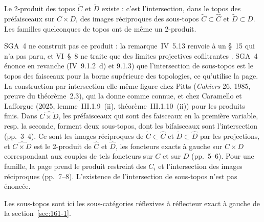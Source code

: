 \begin{encadre}
\begin{theoreme*}\nonverifie
Le 2-produit des topos $\tilde C$ et $\tilde D$ existe : c'est l'intersection, dans le topos des préfaisceaux sur $C \times D$, des images réciproques des sous-topos $\tilde C \subset \hat C$ et $\tilde D \subset \hat D$. Les familles quelconques de topos ont de même un 2-produit.
\end{theoreme*}
\end{encadre}
\begin{demopage}[pages 3 à 8]
SGA~4 ne construit pas ce produit : la remarque~IV~5.13 renvoie à un §~15 qui n'a pas paru, et VI~§~8 ne traite que des limites projectives cofiltrantes \cite{sga4-1}. SGA~4 énonce en revanche (IV~9.1.2~d) et 9.1.3) que l'intersection de sous-topos est le topos des faisceaux pour la borne supérieure des topologies, ce qu'utilise la page. La construction par intersection elle-même figure chez Pitts (\emph{Cahiers} 26, 1985, preuve du théorème~2.3), qui la donne comme connue, et chez Caramello et Lafforgue (2025, lemme~III.1.9~(ii), théorème~III.1.10~(ii)) pour les produits finis. Dans $\widehat{C \times D}$, les préfaisceaux qui sont des faisceaux en la première variable, resp. la seconde, forment deux sous-topos, dont les bifaisceaux sont l'intersection (pp.~3--4). Ce sont les images réciproques de $\tilde C \subset \hat C$ et $\tilde D \subset \hat D$ par les projections, et $\widehat{C \times D}$ est le 2-produit de $\hat C$ et $\hat D$, les foncteurs exacts à gauche sur $C \times D$ correspondant aux couples de tels foncteurs sur $C$ et sur $D$ (pp.~5--6). Pour une famille, la page prend le produit restreint des $C_i$ et l'intersection des images réciproques (pp.~7--8). L'existence de l'intersection de sous-topos n'est pas énoncée.
\end{demopage}
{\small Les sous-topos sont ici les sous-catégories réflexives à réflecteur exact à gauche de la section~\ref{sec:161-1}.\par}

